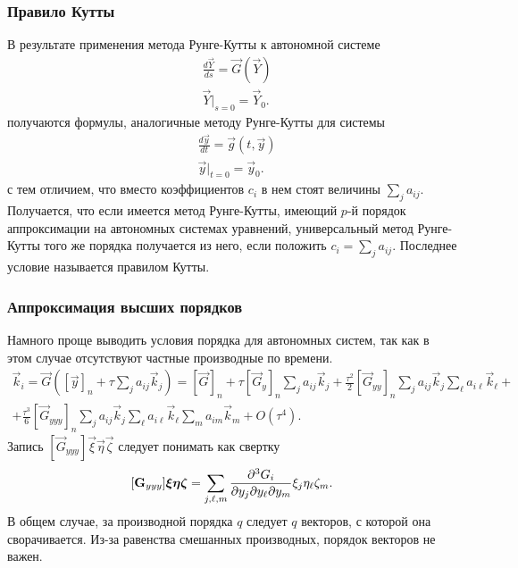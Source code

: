 \documentclass[professionalfonts,compress,unicode,aspectratio=169]{beamer}
\begin{document}
\begin{frame}\frametitle{Правило Кутты}
	В результате применения метода Рунге-Кутты к автономной системе
	\begin{align*}
		&\frac{d\vec Y}{ds} = \vec G(\vec Y)\\
		&\vec Y\big|_{s=0} = \vec Y_0.
	\end{align*}
	получаются формулы, аналогичные методу Рунге-Кутты для системы
	\begin{align*}
		&\frac{d\vec y}{dt} = \vec g(t, \vec y)\\
		&\vec y\big|_{t=0} = \vec y_0.
	\end{align*}
	с тем отличием, что вместо коэффициентов $c_i$ в нем стоят величины $\sum_j
a_{ij}$. Получается, что если имеется метод Рунге-Кутты, имеющий $p$-й порядок
аппроксимации на автономных системах уравнений, универсальный метод Рунге-Кутты
того же порядка получается из него, если положить $c_i = \sum_j a_{ij}$.
Последнее условие называется правилом Кутты.
\end{frame}

\begin{frame}\frametitle{Аппроксимация высших порядков}
	Намного проще выводить условия порядка для автономных систем, так как в этом
случае отсутствуют частные производные по времени.
	\begin{multline*}
	\vec k_i = \vec G([\vec y]_n + \tau \sum_j a_{ij} \vec k_j) = [\vec G]_n
	+ \tau [\vec G_y]_n \sum_j a_{ij} \vec k_j + \frac{\tau^2}{2} [\vec
G_{yy}]_n
	\sum_j a_{ij} \vec k_j \sum_{\ell} a_{i\ell} \vec k_\ell + \\ +
	\frac{\tau^3}{6} [\vec G_{yyy}]_n \sum_j a_{ij} \vec k_j \sum_\ell a_{i\ell} \vec
k_\ell \sum_{m} a_{im} \vec k_m + O(\tau^4).
	\end{multline*}
	Запись $[\vec G_{yyy}]\vec \xi\vec \eta\vec \zeta$ следует понимать как
свертку
	\[
	[\boldsymbol{\mathbf{G}}_{yyy}]\boldsymbol{\mathbf{\xi}}\boldsymbol{\mathbf{\eta}}\boldsymbol{\mathbf{\zeta}} = \sum_{j,\ell,m}\frac{\partial {}^3 G_i}{\partial y_j
\partial y_\ell \partial y_m} \xi_j \eta_\ell \zeta_m.
	\]
	В общем случае, за производной порядка $q$ следует $q$ векторов, с которой
она сворачивается. Из-за равенства смешанных производных, порядок векторов не
важен.
\end{frame}
\end{document}
